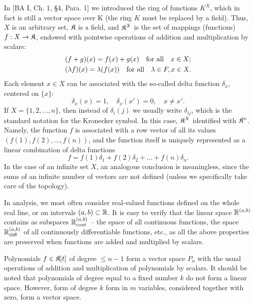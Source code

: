 \begin{example}\label{ex:function-space}
	In [BA I, Ch. 1, \S4, Para. 1] we introduced the ring of functions $K^X$, which in fact is still a vector space over K (the ring $K$ must be replaced by a field). Thus, $X$ is an arbitrary set, ${\mathfrak{K}}$ is a field, and ${{\mathfrak{K}}}^X$ is the set of mappings (functions) $f: X\to {\mathfrak{K}}$, endowed with pointwise operations of addition and multiplication by scalars:
\begin{align*}
(f+g)(x) = f(x)+g(x) \text{\quad for all\quad} x\in X;\\
(\lambda f)(x) = \lambda (f(x)) \text{\quad for all\quad} \lambda\in F, x\in X.
\end{align*}
Each element $x\in X$ can be associated with the so-called delta function $\delta_x$, centered on $\{x\}$:
\[\delta_x(x) = 1, \quad \delta_x(x') = 0, \quad x\ne x'.\]
If $X = \{1, 2,\dots, n\}$, then instead of $\delta_i (j)$ we usually write $\delta_{ij}$, which is the standard notation for the Kronecker symbol. In this case, ${{\mathfrak{K}}}^X$ identified with ${{\mathfrak{K}}}^n$. Namely, the function $f$ is associated with a row vector of all its values $(f(1),f(2),\dots ,f(n))$, and the function itself is uniquely represented as a linear combination of delta functions
\[f = f(1)\delta_1 + f(2)\delta_2 + \dots + f(n)\delta_n.\]
In the case of an infinite set $X$, an analogous conclusion is meaningless, since the sums of an infinite number of vectors are not defined (unless we specifically take care of the topology).

In analysis, we most often consider real-valued functions defined on the whole real line, or on intervals $(a, b)\subset {\mathbb{R}}$. It is easy to verify that the linear space ${\mathbb{R}}^{(a,b)}$ contains as subspaces ${\mathbb{R}}_{\mathrm{cont}}^{(a,b)}$ -- the space of all continuous functions, the space ${\mathbb{R}}_{\mathrm{diff}}^{(a,b)}$ of all continuously differentiable functions, etc., as all the above properties are preserved when functions are added and multiplied by scalars.
\end{example}

\begin{example}
	Polynomials $f\in {\mathfrak{K}} [t]$ of degree $\le n-1$ form a vector space $P_n$ with the usual operations of addition and multiplication of polynomials by scalars. It should be noted that polynomials of degree equal to a fixed number $k$ do not form a linear space. However, form of degree $k$ form in $m$ variables, considered together with zero, form a vector space. 
\end{example}

